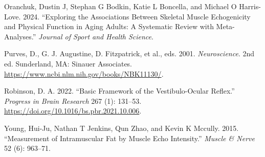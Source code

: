 \documentclass[
  letterpaper,
  DIV=11,
  numbers=noendperiod]{scrartcl}
\newlength{\cslhangindent}
\newenvironment{CSLReferences}[2] %
 {\begin{list}{}{%
  \setlength{\itemindent}{0pt}
  \setlength{\leftmargin}{0pt}
  \setlength{\parsep}{0pt}
  \ifodd #1
   \setlength{\leftmargin}{\cslhangindent}
   \setlength{\itemindent}{-1\cslhangindent}
  \fi
  \setlength{\itemsep}{#2\baselineskip}}}
 {\end{list}}
\begin{document}
\begin{CSLReferences}{1}{0}
Oranchuk, Dustin J, Stephan G Bodkin, Katie L Boncella, and Michael O
Harris-Love. 2024. {``Exploring the Associations Between Skeletal Muscle
Echogenicity and Physical Function in Aging Adults: A Systematic Review
with Meta-Analyses.''} \emph{Journal of Sport and Health Science}.

Purves, D., G. J. Augustine, D. Fitzpatrick, et al., eds. 2001.
\emph{Neuroscience}. 2nd ed. Sunderland, MA: Sinauer Associates.
\url{https://www.ncbi.nlm.nih.gov/books/NBK11130/}.

Robinson, D. A. 2022. {``Basic Framework of the Vestibulo-Ocular
Reflex.''} \emph{Progress in Brain Research} 267 (1): 131--53.
\url{https://doi.org/10.1016/bs.pbr.2021.10.006}.

Young, Hui-Ju, Nathan T Jenkins, Qun Zhao, and Kevin K Mccully. 2015.
{``Measurement of Intramuscular Fat by Muscle Echo Intensity.''}
\emph{Muscle \& Nerve} 52 (6): 963--71.

\end{CSLReferences}
\end{document}
